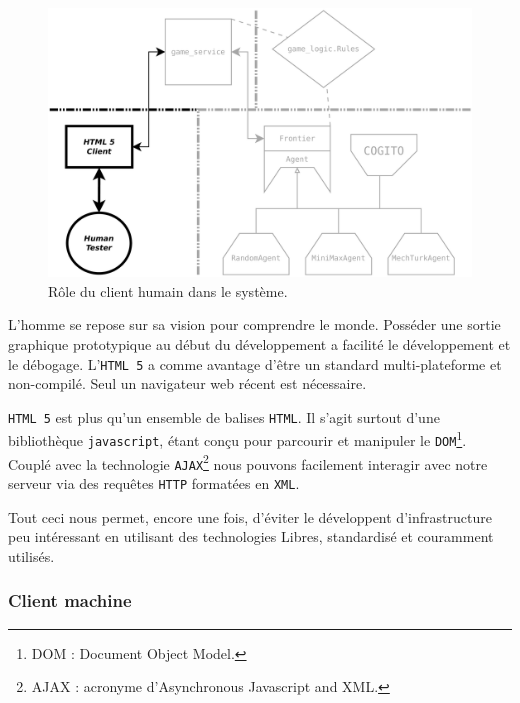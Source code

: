 \begin{figure}[H] 
\centering
\includegraphics[width=\textwidth]{files/william/archi_client_humain} 
\caption{Rôle du client humain dans le système.} 
\end{figure} 

L'homme se repose sur sa vision pour comprendre le monde. Posséder une sortie graphique prototypique au début du développement a facilité le développement et le débogage. L'\texttt{HTML 5} a comme avantage d'être un standard multi-plateforme et non-compilé. Seul un navigateur web récent est nécessaire.

\og \texttt{HTML 5} \fg{} est plus qu'un ensemble de balises \texttt{HTML}. Il s'agit surtout d'une bibliothèque \texttt{javascript}, étant conçu pour parcourir et manipuler le \texttt{DOM}\footnote{DOM : Document Object Model.}. Couplé avec la technologie \texttt{AJAX}\footnote{AJAX : acronyme d'Asynchronous Javascript and XML.} nous pouvons facilement interagir avec notre serveur via des requêtes \texttt{HTTP} formatées en \texttt{XML}.

Tout ceci nous permet, encore une fois, d'éviter le développent d'infrastructure peu intéressant en utilisant des technologies Libres, standardisé et couramment utilisés.   

\subsubsection{Client machine}

